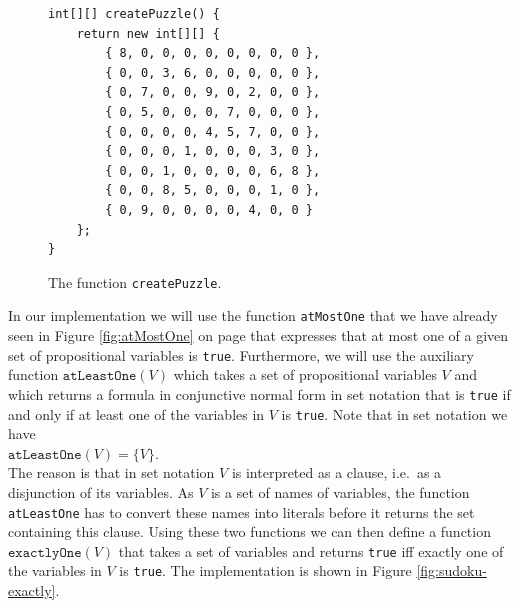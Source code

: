\begin{figure}[!ht]
\centering
\begin{verbatim}
int[][] createPuzzle() {
    return new int[][] {
        { 8, 0, 0, 0, 0, 0, 0, 0, 0 },
        { 0, 0, 3, 6, 0, 0, 0, 0, 0 },
        { 0, 7, 0, 0, 9, 0, 2, 0, 0 },
        { 0, 5, 0, 0, 0, 7, 0, 0, 0 },
        { 0, 0, 0, 0, 4, 5, 7, 0, 0 },
        { 0, 0, 0, 1, 0, 0, 0, 3, 0 },
        { 0, 0, 1, 0, 0, 0, 0, 6, 8 },
        { 0, 0, 8, 5, 0, 0, 0, 1, 0 },
        { 0, 9, 0, 0, 0, 0, 4, 0, 0 }
    };
}
\end{verbatim}
\vspace*{-0.3cm}
\caption{The function \texttt{createPuzzle}.}
\label{fig:sudoku-create-puzzle}
\end{figure}

In our implementation we will use the function \texttt{atMostOne} that we have already seen in Figure
\ref{fig:atMostOne} on page \pageref{fig:atMostOne} that expresses that at most one of a given set of
propositional variables is \texttt{true}.  Furthermore, we will use the auxiliary function
$\texttt{atLeastOne}(V)$ which takes a set of propositional variables $V$ and which returns a formula in
conjunctive normal form in set notation that is \texttt{true} if and only if at least one of the variables in
$V$ is \texttt{true}.  Note that in set notation we have
\\[0.2cm]
\hspace*{1.3cm}
$\texttt{atLeastOne}(V) = \bigl\{ V \bigr\}$.
\\[0.2cm]
The reason is that in set notation  $V$ is interpreted as a clause, i.e.~as a disjunction of its variables.
As $V$ is a set of names of variables, the function \texttt{atLeastOne} has to convert these names into
literals before it returns the set containing this clause.
Using these two functions we can then define a function $\texttt{exactlyOne}(V)$ that
takes a set of variables and returns \texttt{true} iff exactly one of the variables in $V$ is \texttt{true}.
The implementation is shown in Figure \ref{fig:sudoku-exactly}.

